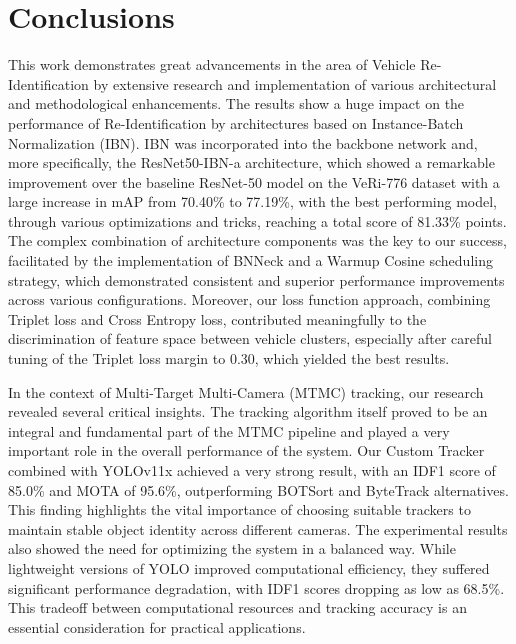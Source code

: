 \chapter{Conclusions}
\label{chap:Conclusions}

This work demonstrates great advancements in the area of Vehicle Re-Identification by extensive research and implementation of various architectural and methodological enhancements. The results show a huge impact on the performance of Re-Identification by architectures based on Instance-Batch Normalization (IBN). IBN was incorporated into the backbone network and, more specifically, the ResNet50-IBN-a architecture, which showed a remarkable improvement over the baseline ResNet-50 model on the VeRi-776 dataset with a large increase in mAP from 70.40\% to 77.19\%, with the best performing model, through various optimizations and tricks, reaching a total score of 81.33\% points.
The complex combination of architecture components was the key to our success, facilitated by the implementation of BNNeck and a Warmup Cosine scheduling strategy, which demonstrated consistent and superior performance improvements across various configurations. Moreover, our loss function approach, combining Triplet loss and Cross Entropy loss, contributed meaningfully to the discrimination of feature space between vehicle clusters, especially after careful tuning of the Triplet loss margin to 0.30, which yielded the best results.

In the context of Multi-Target Multi-Camera (MTMC) tracking, our research revealed several critical insights. The tracking algorithm itself proved to be an integral and fundamental part of the MTMC pipeline and played a very important role in the overall performance of the system. Our Custom Tracker combined with YOLOv11x achieved a very strong result, with an IDF1 score of 85.0\% and MOTA of 95.6\%, outperforming BOTSort and ByteTrack alternatives. This finding highlights the vital importance of choosing suitable trackers to maintain stable object identity across different cameras. The experimental results also showed the need for optimizing the system in a balanced way. While lightweight versions of YOLO improved computational efficiency, they suffered significant performance degradation, with IDF1 scores dropping as low as 68.5\%. This tradeoff between computational resources and tracking accuracy is an essential consideration for practical applications.

